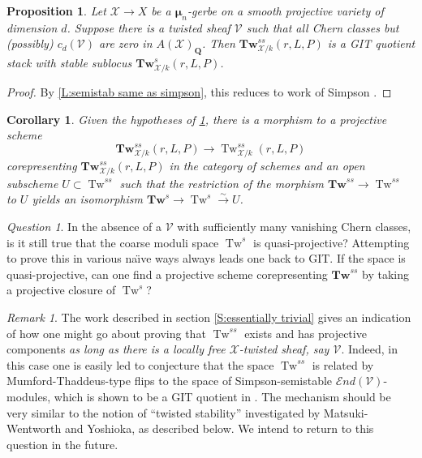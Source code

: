 \documentclass[11pt]{amsart}
\newcommand{\field}[1]{\mathbf #1}
\newcommand{\ms}[1]{\mathscr #1}
\newcommand{\Q}{\field Q}
\newcommand{\simto}{\stackrel{\sim}{\to}}
\newcommand{\send}{\ms E\!nd}
\newcommand{\m}{\boldsymbol{\mu}}
\renewcommand{\[}{[\!\hspace{0.03em}[}
\renewcommand{\]}{]\!\hspace{0.03em}]}
\renewcommand{\(}{(\!\hspace{0.03em}(}
\renewcommand{\)}{)\!\hspace{0.03em})}
\newcommand{\Tw}{\mathbf{Tw}}
\DeclareMathOperator{\mTw}{Tw}
\newtheorem{prop}[lem]{Proposition}
\newtheorem{cor}[lem]{Corollary}
\theoremstyle{definition}
\theoremstyle{remark}
\newtheorem{remark}[lem]{Remark}
\newtheorem{ques}[lem]{Question}
\newenvironment{rem}{\begin{remark}}{\nolinebreak{\hfill $\blacklozenge$} \end{remark}}
\begin{document}
\begin{prop}\label{P:GIT applies} Let $\ms X\to X$ be a $\m_{n}$-gerbe on a smooth 
projective variety of dimension $d$.  Suppose there is a twisted sheaf $\ms V$ such that all 
Chern classes but (possibly) $c_{d}(\ms V)$ are zero in $A(\ms 
X)_{\Q}$.  Then $\Tw^{ss}_{\ms X/k}(r,L,P)$ is a GIT quotient stack 
with stable sublocus $\Tw^{s}_{\ms X/k}(r,L,P)$.
\end{prop}
\begin{proof} By \ref{L:semistab same as simpson}, this reduces to 
work of Simpson \cite[\S4]{simpson}.
\end{proof}

\begin{cor} Given the hypotheses of \ref{P:GIT applies}, there is a 
morphism to a projective scheme $$\Tw^{ss}_{\ms X/k}(r,L,P)\to \mTw^{ss}_{\ms X/k}(r,L,P)$$ 
corepresenting $\Tw^{ss}_{\ms X/k}(r,L,P)$ in the category of schemes 
and an open subscheme $U\subset\mTw^{ss}$ such that the 
restriction of the morphism 
$\Tw^{ss}\to\mTw^{ss}$ to $U$ yields an isomorphism 
$\Tw^{s}\to\mTw^{s}\simto U$.
\end{cor}

\begin{ques} In the absence of a $\ms V$ with sufficiently many vanishing Chern 
classes, is it still true that the coarse moduli space $\mTw^{s}$ is 
quasi-projective?  Attempting to prove this in various na\"\i ve ways 
always leads one back to GIT.  If the space is quasi-projective, can 
one find a projective scheme corepresenting $\Tw^{ss}$ by taking 
a projective closure of $\mTw^{s}$?
\end{ques}

\begin{rem} The work described in section \ref{S:essentially trivial} gives an 
indication of how one might go about proving that $\mTw^{ss}$ exists 
and has projective components \emph{as long as there is a locally 
free $\ms X$-twisted sheaf, say $\ms V$\/}.  Indeed, in this case one is easily led to 
conjecture that the space $\mTw^{ss}$ is related by Mumford-Thaddeus-type 
flips to the space of Simpson-semistable $\send(\ms V)$-modules, which 
is shown to be a GIT quotient in \cite{simpson}.  The mechanism should 
be very similar to the notion of ``twisted stability'' investigated by 
Matsuki-Wentworth and Yoshioka, as described below.  We intend to 
return to this question in the future.
\end{rem}
\end{document}
